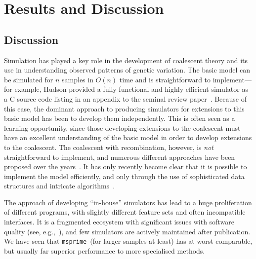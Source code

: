 \documentclass{article}
\newcommand{\msprime}[0]{\texttt{msprime}}
\begin{document}

\section*{Results and Discussion}

\subsection*{Discussion}
Simulation has played a key role in the development of coalescent theory
and its use in understanding observed patterns of genetic variation.
The basic model can be simulated for $n$ samples in $O(n)$ time
and is straightforward to implement---for example, Hudson provided a fully
functional and highly efficient simulator as a C source code listing in an
appendix to the seminal review paper~\citep{hudson1990gene}. Because of
this ease, the dominant approach to producing simulators for extensions
to this basic model has been to develop them independently. This is
often seen as a learning opportunity, since those developing extensions
to the coalescent must have an excellent understanding of the basic
model in order to develop extensions to the coalescent.
The coalescent with recombination, however, is \emph{not} straightforward
to implement, and numerous different approaches have been
proposed over the
years~\citep{hudson1983properties,griffiths1997ancestral,wiuf1999recombination,
mcvean2005approximating}. It has only recently become clear that it is
possible to implement the model efficiently, and only through the use
of sophisticated data structures and
intricate algorithms~\citep{kelleher2016efficient}.

The approach of developing ``in-house'' simulators
has lead to a huge proliferation of different programs, with
slightly different feature sets and often incompatible interfaces.
It is a fragmented ecosystem with significant issues with software
quality (see, e.g.,~\cite{yang2014critical}),
and few simulators are actively maintained after publication.
We have seen that \msprime\ (for larger samples at least)
has at worst comparable, but usually far superior
performance to more specialised methods.
\end{document}
